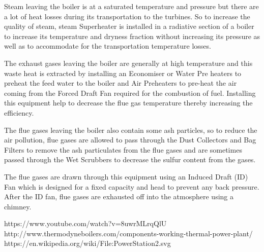 \documentclass[12pt]{report}
\begin{document}
Steam leaving the boiler is at a saturated temperature and pressure but there are a lot of heat losses during its transportation to the turbines. So to increase the quality of steam, steam Superheater is installed in a radiative section of a boiler to increase its temperature and dryness fraction without increasing its pressure as well as to accommodate for the transportation temperature losses.

The exhaust gases leaving the boiler are generally at high temperature and this waste heat is extracted by installing an Economiser or Water Pre heaters to preheat the feed water to the boiler and Air Preheaters to pre-heat the air coming from the Forced Draft Fan required for the combustion of fuel. Installing this equipment help to decrease the flue gas temperature thereby increasing the efficiency.

The flue gases leaving the boiler also contain some ash particles, so to reduce the air pollution, flue gases are allowed to pass through the Dust Collectors and Bag Filters to remove the ash particulates from the flue gases and are sometimes passed through the Wet Scrubbers to decrease the sulfur content from the gases.

The flue gases are drawn through this equipment using an Induced Draft (ID) Fan which is designed for a fixed capacity and head to prevent any back pressure. After the ID fan, flue gases are exhausted off into the atmosphere using a chimney.
\\ 
\begin{thebibliography}{999}
https://www.youtube.com/watch?v=8uwrMLrqQlU
http://www.thermodyneboilers.com/components-working-thermal-power-plant/
https://en.wikipedia.org/wiki/File:PowerStation2.svg
\end{thebibliography}
\end{document}
